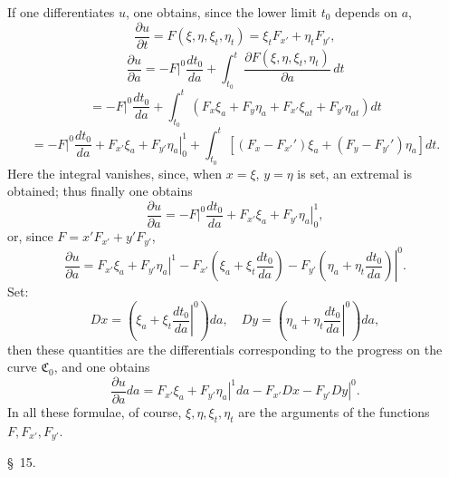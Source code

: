 \documentclass[11pt,a4paper,leqno]{article}
\begin{document}
If one differentiates $u$, one obtains, since the lower limit $t_0$ depends on $a$,
\[
\frac{\partial u}{\partial t}=F(\xi,\eta,\xi_t,\eta_t)=\xi_tF_{x'}+\eta_tF_{y'},
\]
\begin{equation}\tag{30}
\frac{\partial u}{\partial a}
=-\left.F\right|^0\frac{dt_0}{da}
+\int_{t_0}^{t}\frac{\partial F(\xi,\eta,\xi_t,\eta_t)}{\partial a}\,dt
\end{equation}
\[
=-\left.F\right|^0\frac{dt_0}{da}
+\int_{t_0}^{t}\left(F_x\xi_a+F_y\eta_a+F_{x'}\xi_{at}+F_{y'}\eta_{at}\right)dt
\]
\begin{equation}\tag{30}
=-\left.F\right|^0\frac{dt_0}{da}
+\left.F_{x'}\xi_a+F_{y'}\eta_a\right|_0^1
+\int_{t_0}^{t}\left[(F_x-F_{x'}')\xi_a+(F_y-F_{y'}')\eta_a\right]dt.
\end{equation}
Here the integral vanishes, since, when $x=\xi$, $y=\eta$ is set, an extremal is obtained; thus finally one obtains
\begin{equation}\tag{31}
\frac{\partial u}{\partial a}
=-\left.F\right|^0\frac{dt_0}{da}
+\left.F_{x'}\xi_a+F_{y'}\eta_a\right|_0^1,
\end{equation}
or, since $F=x'F_{x'}+y'F_{y'}$,
\[
\frac{\partial u}{\partial a}
=\left.F_{x'}\xi_a+F_{y'}\eta_a\right|^1
-\left.F_{x'}\left(\xi_a+\xi_t\frac{dt_0}{da}\right)
-F_{y'}\left(\eta_a+\eta_t\frac{dt_0}{da}\right)\right|^0.
\]
Set:
\[
Dx=\left(\xi_a+\xi_t\left.\frac{dt_0}{da}\right|^0\right)da,
\quad
Dy=\left(\eta_a+\eta_t\left.\frac{dt_0}{da}\right|^0\right)da,
\]
then these quantities are the differentials corresponding to the progress on the curve $\mathfrak{C}_0$, and one obtains
\begin{equation}\tag{32}
\frac{\partial u}{\partial a}da=
\left.F_{x'}\xi_a+F_{y'}\eta_a\right|^1da
-\left.F_{x'}Dx-F_{y'}Dy\right|^0.
\end{equation}
In all these formulae, of course, $\xi,\eta,\xi_t,\eta_t$ are the arguments of the functions $F,F_{x'},F_{y'}$.

\begin{center}{\large \S~15.}\end{center}
\end{document}
